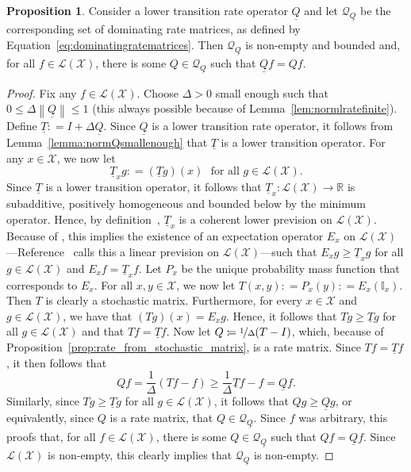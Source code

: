 \documentclass[10pt]{paper}
\theoremstyle{definition}
\newtheorem{proposition}[theorem]{Proposition}
\newcommand{\reals}{\mathbb{R}}
\newcommand{\states}{\mathcal{X}}
\newcommand{\lt}{\underline{T}}
\newcommand{\gambles}{\mathcal{L}}
\newcommand{\gamblesX}{\gambles(\states)}
\newcommand{\ind}[1]{\mathbb{I}_{#1}}
\newcommand{\rateset}{\mathcal{Q}}
\newcommand{\lrate}{\underline{Q}}
\newcommand{\norm}[1]{\left\lVert #1 \right\rVert}
\newcommand{\coloneqq}{:\!=}
\begin{document}
\begin{proposition}
Consider a lower transition rate operator $\lrate$ and let $\rateset_{\lrate}$ be the corresponding set of dominating rate matrices, as defined by Equation~\eqref{eq:dominatingratematrices}. Then $\rateset_{\lrate}$ is non-empty and bounded and, for all $f\in\gamblesX$, there is some $Q\in\rateset_{\lrate}$ such that $\lrate f=Qf$.
\end{proposition}
\begin{proof}
Fix any $f\in\gamblesX$. Choose $\Delta>0$ small enough such that $0\leq\Delta\norm{\lrate}\leq 1$ (this always possible because of Lemma~\ref{lem:normlratefinite}). Define $\lt\coloneqq I+\Delta\lrate$. Since $\lrate$ is a lower transition rate operator, it follows from Lemma~\ref{lemma:normQsmallenough} that $\lt$ is a lower transition operator. For any $x\in\states$, we now let
\begin{equation*}
\lt_xg\coloneqq(\lt g)(x)
\text{~~for all $g\in\gamblesX$.}
\end{equation*}
Since $\lt$ is a lower transition operator, it follows that $\lt_x\colon \gamblesX\to\reals$ is subadditive, positively homogeneous and bounded below by the minimum operator. Hence, by definition~\cite[Definition~2.3.3]{Walley:1991vk}, $\lt_x$ is a coherent lower prevision on $\gamblesX$. Because of \cite[Theorem~3.3.3(b)]{Walley:1991vk}, this implies the existence of an expectation operator $E_x$ on $\gamblesX$---Reference~\cite{Walley:1991vk} calls this a linear prevision on $\gamblesX$---such that $E_xg\geq\lt_xg$ for all $g\in\gamblesX$ and $E_xf=\lt_xf$. Let $P_x$ be the unique probability mass function that corresponds to $E_x$. For all $x,y\in\states$, we now let $T(x,y)\coloneqq P_x(y)\coloneqq E_x(\ind{x})$. Then $T$ is clearly a stochastic matrix. Furthermore, for every $x\in\states$ and $g\in\gamblesX$, we have that $(Tg)(x)=E_xg$. Hence, it follows that $Tg\geq\lt g$ for all $g\in\gamblesX$ and that $Tf=\lt f$. Now let $Q\coloneqq\nicefrac{1}{\Delta}(T-I)$, which, because of Proposition~\ref{prop:rate_from_stochastic_matrix}, is a rate matrix. Since $Tf=\lt f$, it then follows that
\begin{equation*}
Qf=\frac{1}{\Delta}(Tf-f)\geq\frac{1}{\Delta}{\lt f-f}=\lrate f.
\end{equation*}
Similarly, since $Tg\geq\lt g$ for all $g\in\gamblesX$, it follows that $Qg\geq\lrate g$, or equivalently, since $Q$ is a rate matrix, that $Q\in\rateset_{\lrate}$. Since $f$ was arbitrary, this proofs that, for all $f\in\gamblesX$, there is some $Q\in\rateset_{\lrate}$ such that $Qf=\lrate f$. Since $\gamblesX$ is non-empty, this clearly implies that $\rateset_{\lrate}$ is non-empty.


\end{proof}
\end{document}
